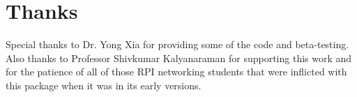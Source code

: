 \documentclass[11pt]{article}
\begin{document}
\section{Thanks}

Special thanks to Dr.  Yong Xia for providing some of the code and 
beta-testing.  Also thanks to Professor Shivkumar Kalyanaraman for supporting 
this work and for the patience of all of those RPI networking students
that were inflicted with this package when it was in its early versions.

%
%

%
%
%
%
%
%
%
%
%
%
\end{document}
